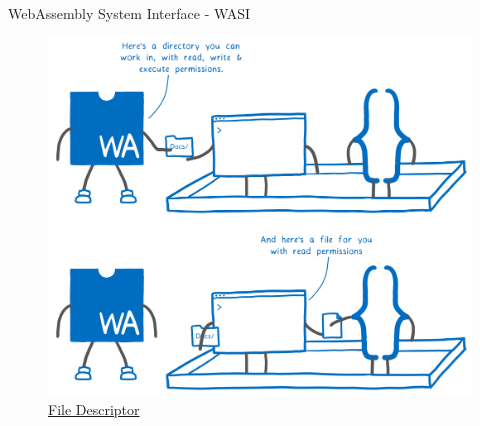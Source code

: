 \documentclass{beamer}
\begin{document}
\begin{frame}{WebAssembly System Interface - WASI}
    \begin{figure}
        \includegraphics[scale=0.06]{./images/file.png}
        \caption{\href{https://hacks.mozilla.org/2019/03/standardizing-wasi-a-webassembly-system-interface/}{File Descriptor}}
    \end{figure}
\end{frame}
\end{document}

